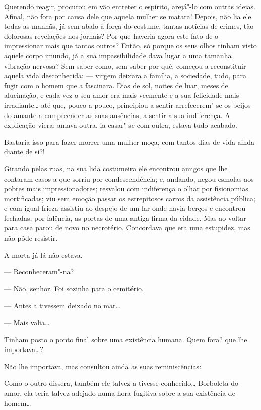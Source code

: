 Querendo reagir, procurou em vão entreter o espírito, arejá"-lo com
outras ideias. Afinal, não fora por causa dele que aquela mulher se
matara! Depois, não lia ele todas as manhãs, já sem abalo à força do
costume, tantas notícias de crimes, tão dolorosas revelações nos
jornais? Por que haveria agora este fato de o impressionar mais que
tantos outros? Então, só porque os seus olhos tinham visto aquele corpo
imundo, já a sua impassibilidade dava lugar a uma tamanha vibração
nervosa? Sem saber como, sem saber por quê, começou a reconstituir
aquela vida desconhecida: --- virgem deixara a família, a sociedade,
tudo, para fugir com o homem que a fascinara. Dias de sol, noites de
luar, meses de alucinação, e cada vez o seu amor era mais veemente e a
sua felicidade mais irradiante\ldots{} até que, pouco a pouco, principiou a
sentir arrefecerem"-se os beijos do amante a compreender as suas
ausências, a sentir a sua indiferença. A explicação viera: amava outra,
ia casar"-se com outra, estava tudo acabado.

Bastaria isso para fazer morrer uma mulher moça, com tantos dias de vida
ainda diante de si?!

Girando pelas ruas, na sua lida costumeira ele encontrou amigos que lhe
contaram casos a que sorriu por condescendência; e, andando, negou
esmolas aos pobres mais impressionadores; resvalou com indiferença o
olhar por fisionomias mortificadas; viu sem emoção passar os
estrepitosos carros da assistência pública; e com igual frieza assistiu
ao despejo de um lar onde havia berços e encontrou fechadas, por
falência, as portas de uma antiga firma da cidade. Mas ao voltar para
casa parou de novo no necrotério. Concordava que era uma estupidez, mas
não pôde resistir.

A morta já lá não estava.

--- Reconheceram"-na?

--- Não, senhor. Foi sozinha para o cemitério.

--- Antes a tivessem deixado no mar\ldots{}

--- Mais valia\ldots{}

Tinham posto o ponto final sobre uma existência humana. Quem fora? que
lhe importava\ldots{}?

Não lhe importava, mas consultou ainda as suas reminiscências:

Como o outro dissera, também ele talvez a tivesse conhecido\ldots{} Borboleta
do amor, ela teria talvez adejado numa hora fugitiva sobre a sua
existência de homem\ldots{}


